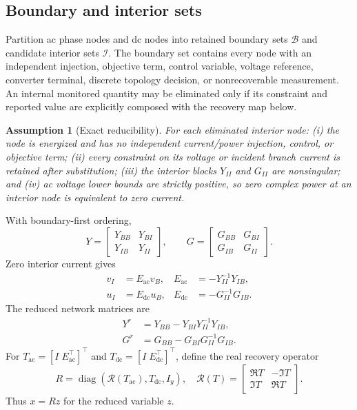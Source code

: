 \documentclass[journal,10pt]{IEEEtran}
\newcommand{\ac}{\mathrm{ac}}
\newcommand{\dc}{\mathrm{dc}}
\newcommand{\cB}{\mathcal{B}}
\newcommand{\cI}{\mathcal{I}}
\newcommand{\diag}{\operatorname{diag}}
\newcommand{\realify}{\mathscr{R}}
\newtheorem{assumption}{Assumption}
\begin{document}
\subsection{Boundary and interior sets}
Partition ac phase nodes and dc nodes into retained boundary sets $\cB$ and
candidate interior sets $\cI$.  The boundary set contains every node with an
independent injection, objective term, control variable, voltage reference,
converter terminal, discrete topology decision, or nonrecoverable measurement.
An internal monitored quantity may be eliminated only if its constraint and
reported value are explicitly composed with the recovery map below.

\begin{assumption}[Exact reducibility]\label{ass:exact}
For each eliminated interior node: (i) the node is energized and has no
independent current/power injection, control, or objective term; (ii) every
constraint on its voltage or incident branch current is retained after
substitution; (iii) the interior blocks $Y_{II}$ and $G_{II}$ are nonsingular;
and (iv) ac voltage lower bounds are strictly positive, so zero complex power at
an interior node is equivalent to zero current.
\end{assumption}

With boundary-first ordering,
\begin{equation}
Y=\begin{bmatrix}Y_{BB}&Y_{BI}\\Y_{IB}&Y_{II}\end{bmatrix},\qquad
G=\begin{bmatrix}G_{BB}&G_{BI}\\G_{IB}&G_{II}\end{bmatrix}.
\end{equation}
Zero interior current gives
\begin{align}
v_I&=E_{\ac}v_B, & E_{\ac}&=-Y_{II}^{-1}Y_{IB},\label{eq:ac_recovery}\\
u_I&=E_{\dc}u_B, & E_{\dc}&=-G_{II}^{-1}G_{IB}.\label{eq:dc_recovery}
\end{align}
The reduced network matrices are
\begin{align}
Y^r&=Y_{BB}-Y_{BI}Y_{II}^{-1}Y_{IB},\label{eq:kron_ac}\\
G^r&=G_{BB}-G_{BI}G_{II}^{-1}G_{IB}.\label{eq:kron_dc}
\end{align}
For $T_{\ac}=[I\;E_{\ac}^\top]^\top$ and
$T_{\dc}=[I\;E_{\dc}^\top]^\top$, define the real recovery operator
\begin{equation}
R=\diag\!\left(\realify(T_{\ac}),T_{\dc},I_y\right),\quad
\realify(T)=\begin{bmatrix}\Re T&-\Im T\\\Im T&\Re T\end{bmatrix}.
\label{eq:R}
\end{equation}
Thus $x=Rz$ for the reduced variable $z$.
\end{document}
